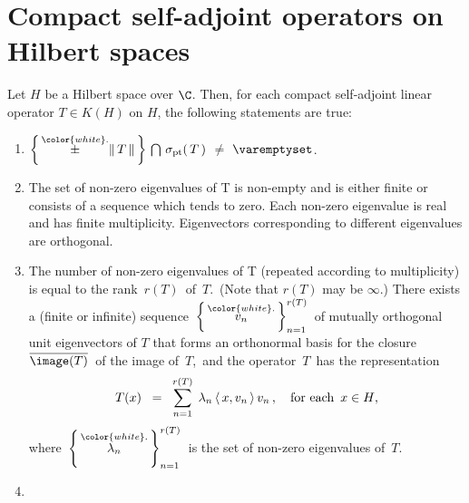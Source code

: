 

\section{Compact self-adjoint operators on Hilbert spaces}
\setcounter{theorem}{0}
\setcounter{equation}{0}


\renewcommand{\theenumi}{\roman{enumi}}
\renewcommand{\labelenumi}{\textnormal{(\theenumi)}$\;\;$}


\begin{theorem}\mbox{}
\vskip 0.1cm
\noindent
Let $H$ be a Hilbert space over $\C$.
Then, for each compact self-adjoint linear operator $T \in K(H)$ on $H$, the following statements are true:
\begin{enumerate}
\item
	$\left\{\,\overset{{\color{white}.}}{\pm}\Vert\,T\,\Vert\,\right\} \,\bigcap\, \sigma_{\textnormal{pt}}(\,T\,)$
	$\neq$ $\varemptyset$.
\item
	The set of non-zero eigenvalues of T is non-empty and is either finite or consists
	of a sequence which tends to zero. Each non-zero eigenvalue is real and has finite
	multiplicity. Eigenvectors corresponding to different eigenvalues are orthogonal.
\item
	The number of non-zero eigenvalues of T (repeated according to multiplicity)
	is equal to the rank \,$r(T)$\, of \,$T$.\,
	(Note that $r(T)$ may be $\infty$.)
	There exists a (finite or infinite) sequence
	\,$\left\{\,\overset{{\color{white}.}}{v_{n}}\,\right\}^{r(T)}_{n=1}$\,
	of mutually orthogonal unit eigenvectors of $T$
	that forms an orthonormal basis for the closure
	\,$\overline{\image(T)}$\,
	of the image of \,$T$,\, and the operator \,$T$\, has the representation
	\begin{equation*}
	T(x)
	\;\; = \;\;
		\overset{r(T)}{\underset{n=1}{\sum}}\;\,
		\lambda_{n}\,\langle\, x , v_{n} \,\rangle\,v_{n}\,,
	\quad
	\textnormal{for each \,$x \in H$},
	\end{equation*}
	where 
	\,$\left\{\,\overset{{\color{white}.}}{\lambda_{n}}\,\right\}^{r(T)}_{n=1}$\,
	is the set of non-zero eigenvalues of \,$T$.
\item

\end{enumerate}
\end{theorem}
